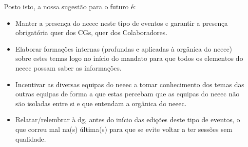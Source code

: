 Posto isto, a nossa sugestão para o futuro é:
\begin{itemize}
\item Manter a presença do \acrshort{neeec} neste tipo de eventos e garantir a presença obrigatória quer dos CGs, quer dos Colaboradores.
\item Elaborar formações internas (profundas e aplicadas à orgânica do \acrshort{neeec}) sobre estes temas logo no início do mandato para que todos os elementos do \acrshort{neeec} possam saber as informações.
\item Incentivar as diversas equipas do \acrshort{neeec} a tomar conhecimento dos temas das outras equipas de forma a que estas percebam que as equipas do \acrshort{neeec} não são isoladas entre si e que entendam a orgânica do \acrshort{neeec}.
\item Relatar/relembrar à \acrshort{dg}, antes do início das edições deste tipo de eventos, o que correu mal na(s) última(s) para que se evite voltar a ter sessões sem qualidade.
\end{itemize}
